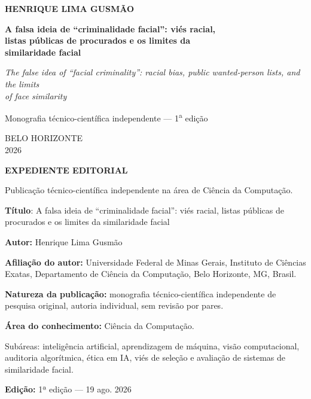 \documentclass[12pt,oneside,a4paper,openany,brazil]{abntex2}
\newcommand{\frontheading}[1]{\par\noindent\textbf{#1}\par\vspace{3pt}}
\begin{document}
\pretextual
\pagestyle{empty}

\begin{center}
{\bfseries\fontsize{13}{15}\selectfont HENRIQUE LIMA GUSMÃO\par}
\vspace{5.4cm}
{\bfseries\fontsize{18}{21}\selectfont A falsa ideia de ``criminalidade facial'': viés racial,\\
listas públicas de procurados e os limites da\\
similaridade facial\par}
\vspace{0.65cm}
{\itshape\fontsize{11.5}{13}\selectfont The false idea of ``facial criminality'': racial bias, public wanted-person lists, and the limits\\
of face similarity\par}
\vfill
{\fontsize{12}{14}\selectfont Monografia técnico-científica independente --- 1\textsuperscript{a} edição\par}
\vfill
{\fontsize{12}{14}\selectfont BELO HORIZONTE\\
2026\par}
\end{center}
\clearpage

\begingroup\SingleSpacing\setlength{\parindent}{0pt}\fontsize{10.7}{12.6}\selectfont
\frontheading{EXPEDIENTE EDITORIAL}
Publicação técnico-científica independente na área de Ciência da Computação.\par\vspace{6pt}
\textbf{Título}: A falsa ideia de ``criminalidade facial'': viés racial, listas públicas de procurados e os limites da similaridade facial\par
\textbf{Autor:} Henrique Lima Gusmão\par
\textbf{Afiliação do autor:} Universidade Federal de Minas Gerais, Instituto de Ciências Exatas, Departamento de Ciência da Computação, Belo Horizonte, MG, Brasil.\par
\textbf{Natureza da publicação:} monografia técnico-científica independente de pesquisa original, autoria individual, sem revisão por pares.\par
\textbf{Área do conhecimento:} Ciência da Computação.\par
Subáreas: inteligência artificial, aprendizagem de máquina, visão computacional, auditoria algorítmica, ética em IA, viés de seleção e avaliação de sistemas de similaridade facial.\par
\textbf{Edição:} 1ª edição --- 19 ago. 2026\par
\end{document}
